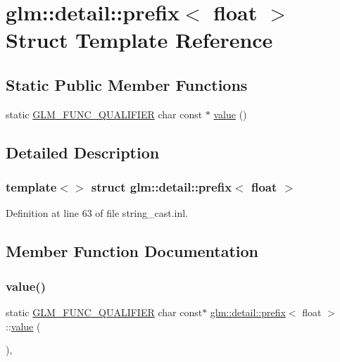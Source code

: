 \hypertarget{structglm_1_1detail_1_1prefix_3_01float_01_4}{}\section{glm\+::detail\+::prefix$<$ float $>$ Struct Template Reference}
\label{structglm_1_1detail_1_1prefix_3_01float_01_4}
\subsection*{Static Public Member Functions}
\begin{DoxyCompactItemize}
\item 
static \mbox{\hyperlink{setup_8hpp_a33fdea6f91c5f834105f7415e2a64407}{G\+L\+M\+\_\+\+F\+U\+N\+C\+\_\+\+Q\+U\+A\+L\+I\+F\+I\+ER}} char const  $\ast$ \mbox{\hyperlink{structglm_1_1detail_1_1prefix_3_01float_01_4_a106cde8d6d62001a05cbf21367467591}{value}} ()
\end{DoxyCompactItemize}


\subsection{Detailed Description}
\subsubsection*{template$<$$>$\newline
struct glm\+::detail\+::prefix$<$ float $>$}



Definition at line 63 of file string\+\_\+cast.\+inl.



\subsection{Member Function Documentation}
\mbox{\label{structglm_1_1detail_1_1prefix_3_01float_01_4_a106cde8d6d62001a05cbf21367467591}} 
\subsubsection{\texorpdfstring{value()}{value()}}
{\footnotesize\ttfamily static \mbox{\hyperlink{setup_8hpp_a33fdea6f91c5f834105f7415e2a64407}{G\+L\+M\+\_\+\+F\+U\+N\+C\+\_\+\+Q\+U\+A\+L\+I\+F\+I\+ER}} char const$\ast$ \mbox{\hyperlink{structglm_1_1detail_1_1prefix}{glm\+::detail\+::prefix}}$<$ float $>$\+::\mbox{\hyperlink{glad_8h_a03aff08f73d7fde3d1a08e0abd8e84fa}{value}} (\begin{DoxyParamCaption}{ }\end{DoxyParamCaption})\hspace{0.3cm}{\ttfamily [inline]}, {\ttfamily [static]}}



